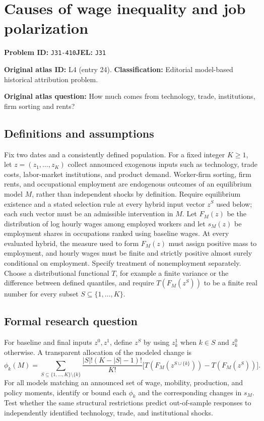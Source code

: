 \documentclass[11pt,a4paper]{article}
\begin{document}
\section*{Causes of wage inequality and job polarization}
\textbf{Problem ID:} \texttt{J31-410}\quad \textbf{JEL:} \texttt{J31}\par
\label{problem:OP-0024}
\label{atlas:prob:L4}
\noindent\textbf{Original atlas ID:} L4 (entry 24). \textbf{Classification:} Editorial model-based historical attribution problem.

\noindent\textbf{Original atlas question:} How much comes from technology, trade, institutions, firm sorting and rents?

\subsection*{Definitions and assumptions}
Fix two dates and a consistently defined population. For a fixed integer $K\geq1$, let $z=(z_1,\ldots,z_K)$ collect announced exogenous inputs such as technology, trade costs, labor-market institutions, and product demand. Worker-firm sorting, firm rents, and occupational employment are endogenous outcomes of an equilibrium model $M$, rather than independent shocks by definition. Require equilibrium existence and a stated selection rule at every hybrid input vector $z^S$ used below; each such vector must be an admissible intervention in $M$. Let $F_M(z)$ be the distribution of log hourly wages among employed workers and let $s_M(z)$ be employment shares in occupations ranked using baseline wages. At every evaluated hybrid, the measure used to form $F_M(z)$ must assign positive mass to employment, and hourly wages must be finite and strictly positive almost surely conditional on employment. Specify treatment of nonemployment separately. Choose a distributional functional $T$, for example a finite variance or the difference between defined quantiles, and require $T(F_M(z^S))$ to be a finite real number for every subset $S\subseteq\{1,\ldots,K\}$.
\subsection*{Formal research question}
For baseline and final inputs $z^0,z^1$, define $z^S$ by using $z_k^1$ when $k\in S$ and $z_k^0$ otherwise. A transparent allocation of the modeled change is
\[
 \phi_k(M)=\sum_{S\subseteq\{1,\ldots,K\}\setminus\{k\}}
 \frac{|S|!(K-|S|-1)!}{K!}
 \bigl[T(F_M(z^{S\cup\{k\}}))-T(F_M(z^S))\bigr].
\]
For all models matching an announced set of wage, mobility, production, and policy moments, identify or bound each $\phi_k$ and the corresponding changes in $s_M$. Test whether the same structural restrictions predict out-of-sample responses to independently identified technology, trade, and institutional shocks.
\end{document}
